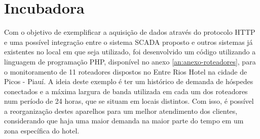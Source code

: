         \begin{figure}[!h]
    	\end{figure}
    	


\section{Incubadora}
\label{sec:incubadora}
Com o objetivo de exemplificar a aquisição de dados através do protocolo \gls{HTTP} e uma possível integração entre o sistema \gls{SCADA} proposto e outros sistemas já existentes no local em que seja utilizado, foi desenvolvido um código utilizando a linguagem de programação PHP, disponível no anexo \ref{an:anexo-roteadores}, para o monitoramento de 11 roteadores dispostos no Entre Rios Hotel na cidade de Picos - Piauí. A ideia deste exemplo é ter um histórico de demanda de hóspedes conectados e a máxima largura de banda utilizada em cada um dos roteadores num período de 24 horas, que se situam em locais distintos. Com isso, é possível a reorganização destes aparelhos para um melhor atendimento dos clientes, considerando que haja uma maior demanda na maior parte do tempo em um zona específica do hotel.

        \begin{figure}[!h]
    	\end{figure}
    	
